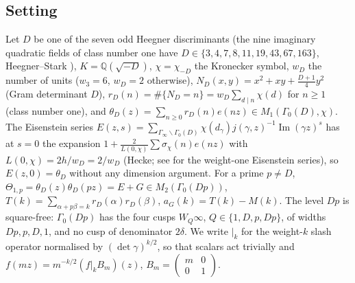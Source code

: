 \documentclass[11pt]{amsart}
\theoremstyle{remark}
\newcommand{\Q}{\mathbb{Q}}
\begin{document}
\subsection{Setting}
Let $D$ be one of the seven odd Heegner discriminants (the nine imaginary quadratic fields of class number one have $D\in\{3,4,7,8,11,19,43,67,163\}$, Heegner--Stark \cite{Stark}), $K=\Q(\sqrt{-D})$, $\chi=\chi_{-D}$ the Kronecker symbol, $w_D$ the number of units ($w_3=6$, $w_D=2$ otherwise), $N_D(x,y)=x^2+xy+\frac{D+1}4y^2$ (Gram determinant $D$), $r_D(n)=\#\{N_D=n\}=w_D\sum_{d\mid n}\chi(d)$ for $n\ge1$ (class number one), and $\theta_D(z)=\sum_{n\ge0}r_D(n)e(nz)\in M_1(\Gamma_0(D),\chi)$. The Eisenstein series $E(z,s)=\sum_{\Gamma_\infty\backslash\Gamma_0(D)}\chi(d_\gamma)j(\gamma,z)^{-1}\operatorname{Im}(\gamma z)^s$ has at $s=0$ the expansion $1+\frac2{L(0,\chi)}\sum\sigma_\chi(n)e(nz)$ with $L(0,\chi)=2h/w_D=2/w_D$ (Hecke; see \cite[Chapter~4]{DS} for the weight-one Eisenstein series), so $E(z,0)=\theta_D$ without any dimension argument. For a prime $p\ne D$, $\Theta_{1,p}=\theta_D(z)\theta_D(pz)=E+G\in M_2(\Gamma_0(Dp))$, $T(k)=\sum_{\alpha+p\beta=k}r_D(\alpha)r_D(\beta)$, $a_G(k)=T(k)-M(k)$. The level $Dp$ is square-free: $\Gamma_0(Dp)$ has the four cusps $W_Q\infty$, $Q\in\{1,D,p,Dp\}$, of widths $Dp,p,D,1$, and no cusp of denominator $2\delta$. We write $|_k$ for the weight-$k$ slash operator normalised by $(\det\gamma)^{k/2}$, so that scalars act trivially and $f(mz)=m^{-k/2}(f|_kB_m)(z)$, $B_m=\left(\begin{smallmatrix}m&0\\0&1\end{smallmatrix}\right)$.
\end{document}
